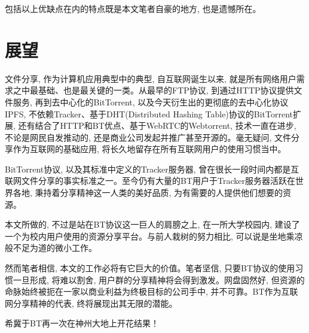 包括以上优缺点在内的特点既是本文笔者自豪的地方, 也是遗憾所在。

\section{展望}

文件分享, 作为计算机应用典型中的典型, 自互联网诞生以来, 就是所有网络用户需求之中最基础、也是最关键的一类。从最早的FTP协议, 到通过HTTP协议提供文件服务, 再到去中心化的BitTorrent, 以及今天衍生出的更彻底的去中心化协议IPFS\cite{DBLP:journals/corr/Benet14}, 不依赖Tracker、基于DHT\cite{andrewloewenstern2008bep0005}(Distributed Hashing Table)协议的BitTorrent扩展, 还有结合了HTTP和BT优点、基于WebRTC的Webtorrent, 技术一直在进步, 不论是网民自发推动的, 还是商业公司发起并推广甚至开源的。毫无疑问, 文件分享作为互联网的基础应用, 将长久地留存在所有互联网用户的使用习惯当中。

BitTorrent协议, 以及其标准中定义的Tracker服务器, 曾在很长一段时间内都是互联网文件分享的事实标准之一。至今仍有大量的BT用户于Tracker服务器活跃在世界各地, 秉持着分享精神这一人类的美好品质, 为有需要的人提供他们想要的资源。

本文所做的, 不过是站在BT协议这一巨人的肩膀之上, 在一所大学校园内, 建设了一个为校内用户使用的资源分享平台。与前人栽树的努力相比, 可以说是坐地乘凉般不足为道的微小工作。

然而笔者相信, 本文的工作必将有它巨大的价值。笔者坚信, 只要BT协议的使用习惯一旦形成, 将难以割舍, 用户群的分享精神将会得到激发。网盘固然好, 但资源的命脉始终被扼在一家以商业利益为终极目标的公司手中, 并不可靠。BT作为互联网分享精神的代表, 终将展现出其无限的潜能。

希冀于BT再一次在神州大地上开花结果！




